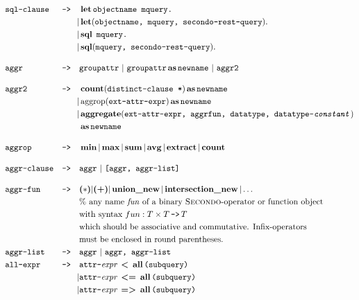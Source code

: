 %
%
%

\begin{align*}
&\texttt{sql-clause} &\texttt{-->}\quad &\op{let} \texttt{objectname mquery.}\\
&&|&\op{let}(\texttt{objectname, mquery, secondo-rest-query}).\\
&&|&\op{sql}\ \texttt{mquery.}\\
&&|&\op{sql}(\texttt{mquery, secondo-rest-query}).\\[1em]
&\texttt{aggr} &\texttt{-->}\quad &\texttt{groupattr}\ |\ \texttt{groupattr} \op{as} \texttt{newname}\ |\ \texttt{aggr2}\\[1em]
&\texttt{aggr2} &\texttt{-->}\quad &\op{count}(\texttt{distinct-clause *}) \op{as} \texttt{newname}\\
&&|&\operatorname{aggrop}(\texttt{ext-attr-expr}) \op{as} \texttt{newname}\\
&&|&\op{aggregate}(\texttt{ext-attr-expr, aggrfun, datatype, datatype-\textit{constant}})\\
&&&\op{as} \texttt{newname}\\[1em]
&\texttt{aggrop} &\texttt{-->}\quad &\op{min}|\op{max}|\op{sum}|\op{avg}|\op{extract}|\op{count}\\[1em]
&\texttt{aggr-clause} &\texttt{-->}\quad &\texttt{aggr}\ |\ \texttt{[aggr, aggr-list]}\\[1em]
&\texttt{aggr-fun} &\texttt{-->}\quad &\textbf{(\begin{math}*\end{math})} |\textbf{(+)}| \op{union\_new}|\op{intersection\_new}|\dots\\
&&&\text{\% any name \textit{fun} of a binary \textsc{Secondo}-operator or function object}\\
&&&\text{with syntax}\ fun:T \times T\operatorname{\texttt{-->}}T\\
&&&\text{which should be associative and commutative. Infix-operators}\\
&&&\text{must be enclosed in round parentheses.}\\
&\texttt{aggr-list} &\texttt{-->}\quad &\texttt{aggr}\ |\ \texttt{aggr, aggr-list}\\
&\texttt{all-expr} &\texttt{-->}\quad &\texttt{attr-}\textit{expr}\ \op{<}\ \op{all}\texttt{(subquery)} \\
&&|&\texttt{attr-}\textit{expr}\ \op{<=}\ \op{all}\texttt{(subquery)} \\
&&|&\texttt{attr-}\textit{expr}\ \op{=>}\ \op{all}\texttt{(subquery)} \\

\end{align*}
